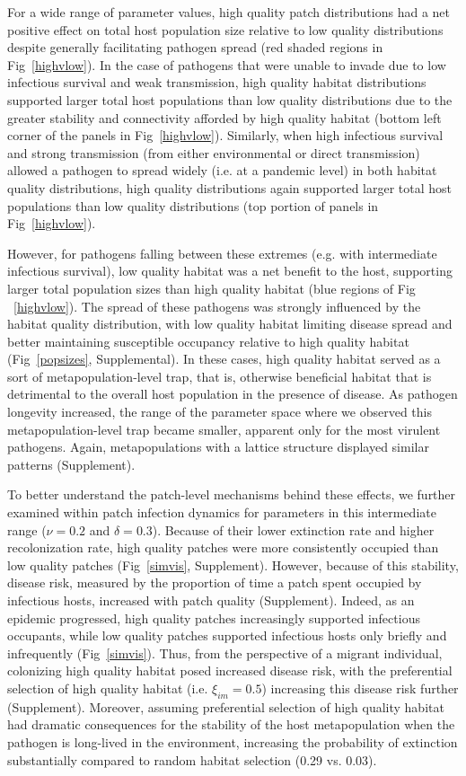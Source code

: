 \documentclass{article}
\begin{document}
For a wide range of parameter values, high quality patch distributions had a net positive effect on total host population size relative to low quality distributions despite generally facilitating pathogen spread (red shaded regions in Fig~\ref{highvlow}).  
In the case of pathogens that were unable to invade due to low infectious survival and weak transmission, high quality habitat distributions supported larger total host populations than low quality distributions due to the greater stability and connectivity afforded by high quality habitat (bottom left corner of the panels in Fig~\ref{highvlow}). 
Similarly, when high infectious survival and strong transmission (from either environmental or direct transmission) allowed a pathogen to spread widely (i.e. at a pandemic level) in both habitat quality distributions, high quality distributions again supported larger total host populations than low quality distributions (top portion of panels in Fig~\ref{highvlow}).

However, for pathogens falling between these extremes (e.g. with intermediate infectious survival), low quality habitat was a net benefit to the host, supporting larger total population sizes than high quality habitat (blue regions of Fig ~\ref{highvlow}).
The spread of these pathogens was strongly influenced by the habitat quality distribution, with low quality habitat limiting disease spread and better maintaining susceptible occupancy relative to high quality habitat (Fig~\ref{popsizes}, Supplemental).
In these cases, high quality habitat served as a sort of metapopulation-level trap, that is, otherwise beneficial habitat that is detrimental to the overall host population in the presence of disease.
As pathogen longevity increased, the range of the parameter space where we observed this metapopulation-level trap became smaller, apparent only for the most virulent pathogens.
Again, metapopulations with a lattice structure displayed similar patterns (Supplement).

To better understand the patch-level mechanisms behind these effects, we further examined within patch infection dynamics for parameters in this intermediate range ($\nu = 0.2$ and $\delta = 0.3$).  
Because of their lower extinction rate and higher recolonization rate, high quality patches were more consistently occupied than low quality patches (Fig~\ref{simvis}, Supplement).  
However, because of this stability, disease risk, measured by the proportion of time a patch spent occupied by infectious hosts, increased with patch quality (Supplement).
Indeed, as an epidemic progressed, high quality patches increasingly supported infectious occupants, while low quality patches supported infectious hosts only briefly and infrequently (Fig~\ref{simvis}).  
Thus, from the perspective of a migrant individual, colonizing high quality habitat posed increased disease risk, with the preferential selection of high quality habitat (i.e. $\xi_{im} = 0.5$) increasing this disease risk further (Supplement).
Moreover, assuming preferential selection of high quality habitat had dramatic consequences for the stability of the host metapopulation when the pathogen is long-lived in the environment, increasing the probability of extinction substantially compared to random habitat selection (0.29 vs. 0.03).
\end{document}
